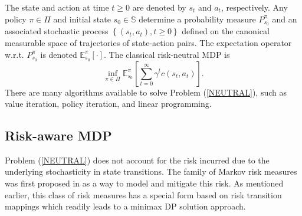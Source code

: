 \documentclass[12pt,technote,onecolumn]{IEEEtran}
\begin{document}
The state and action at time $t\geq0$ are denoted by $s_{t}$ and
$a_{t}$, respectively. Any policy $\pi\in\Pi$ and initial state
$s_{0}\in\mathbb{S}$ determine a probability measure $P_{s_{0}}^{\pi}$
and an associated stochastic process $\left\{ \left(s_{t},a_{t}\right),t\geq0\right\} $
defined on the canonical measurable space of trajectories of state-action
pairs. The expectation operator w.r.t. $P_{s_{0}}^{\pi}$
is denoted $\mathbb{E}_{s_{0}}^{\pi}[\cdot]$. The classical
risk-neutral MDP is
\begin{equation}
\inf_{\pi\in\Pi}\mathbb{E}_{s_{0}}^{\pi}\left[\sum_{t=0}^{\infty}\gamma^{t}c(s_t,a_t)\right].\label{NEUTRAL}
\end{equation}
There are many algorithms available to solve Problem (\ref{NEUTRAL}),
such as value iteration, policy iteration, and linear programming.

\subsection{Risk-aware MDP}\label{sec2.2}

Problem (\ref{NEUTRAL}) does not account for the risk incurred due
to the underlying stochasticity in state transitions. The family of
Markov risk measures was first proposed in \cite{ruszczynski2010risk}
as a way to model and mitigate this risk. As mentioned earlier, this
class of risk measures has a special form based on risk transition
mappings which readily leads to a minimax DP solution approach.
\end{document}
